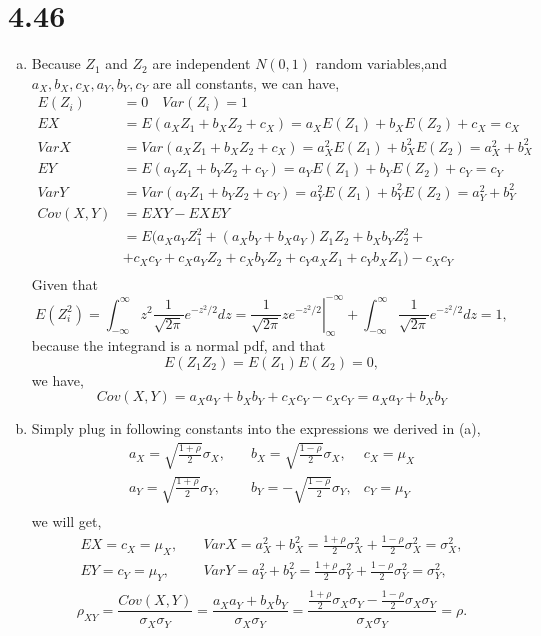 \documentclass[letterpaper]{article}
\newcommand{\intii}{\int_{-\infty}^\infty}
\begin{document}
    \section*{4.46}
    \begin{enumerate}[(a)]
    \item Because $Z_1$ and $Z_2$ are independent $N(0,1)$ random variables,and $a_X, b_X, c_X, a_Y, b_Y, c_Y$ are all constants, we can have,
    \begin{align*}
    E(Z_i) & = 0 \quad Var(Z_i) = 1 \\
    EX & = E(a_X Z_1 + b_X Z_2 + c_X) = a_X E(Z_1) + b_X E(Z_2) + c_X = c_X \\
    Var X & = Var(a_X Z_1 + b_X Z_2 + c_X) = a_X^2 E(Z_1) + b_X^2 E(Z_2) = a_X^2 + b_X^2 \\
    EY & = E(a_Y Z_1 + b_Y Z_2 + c_Y) = a_Y E(Z_1) + b_Y E(Z_2) + c_Y = c_Y \\
    Var Y & = Var(a_Y Z_1 + b_Y Z_2 + c_Y) = a_Y^2 E(Z_1) + b_Y^2 E(Z_2) = a_Y^2 + b_Y^2 \\
    Cov(X,Y) & = EXY - EXEY\\
    &= E\big(a_Xa_Y Z_1^2 + (a_Xb_Y + b_Xa_Y) Z_1Z_2 + b_X b_Y Z_2^2 + \\
    & + c_Xc_Y + c_Xa_YZ_2 + c_Xb_YZ_2 + c_Ya_XZ_1 + c_Yb_XZ_1\big) - c_Xc_Y \\
    \end{align*}
    Given that 
    \[
    E(Z_i^2) = \intii z^2 \frac{1}{\sqrt{2\pi}} e^{-z^2/2} dz = \left.\frac{1}{\sqrt{2\pi}} z e^{-z^2/2} \right|^{-\infty}_\infty + \intii \frac{1}{\sqrt{2\pi}} e^{-z^2/2} dz = 1,
    \]
    because the integrand is a normal pdf, and that
    \[
    E(Z_1Z_2) = E(Z_1)E(Z_2) = 0,
    \]
    we have,
    \[
    Cov(X, Y) = a_Xa_Y + b_X b_Y + c_Xc_Y - c_Xc_Y = a_Xa_Y + b_Xb_Y
    \]
    \item Simply plug in following constants into the expressions we derived in (a),
    \begin{align*}
    a_X = \sqrt{\frac{1+\rho}{2}} \sigma_X,  & \quad b_X = \sqrt{\frac{1-\rho}{2}} \sigma_X, & c_X = \mu_X \\
    a_Y = \sqrt{\frac{1+\rho}{2}} \sigma_Y,  & \quad b_Y = -\sqrt{\frac{1-\rho}{2}} \sigma_Y, & c_Y = \mu_Y \\
    \end{align*}
    we will get,
    \begin{align*}
    EX = c_X = \mu_X, \quad & Var X = a_X^2 + b_X^2 = \frac{1+\rho}{2} \sigma_X^2 + \frac{1-\rho}{2} \sigma_X^2 = \sigma_X^2, \\
    EY = c_Y = \mu_Y, \quad & Var Y = a_Y^2 + b_Y^2 = \frac{1+\rho}{2} \sigma_Y^2 + \frac{1-\rho}{2} \sigma_Y^2 = \sigma_Y^2, \\
    \end{align*}
    \[
    \rho_{XY} = \frac{Cov(X,Y)}{\sigma_X \sigma_Y} =\frac{a_X a_Y + b_X b_Y}{\sigma_X \sigma_Y} = \frac{\frac{1+\rho}{2} \sigma_X \sigma_Y - \frac{1-\rho}{2} \sigma_X \sigma_Y}{\sigma_X \sigma_Y} = \rho.
    \]


\end{enumerate}
\end{document}
